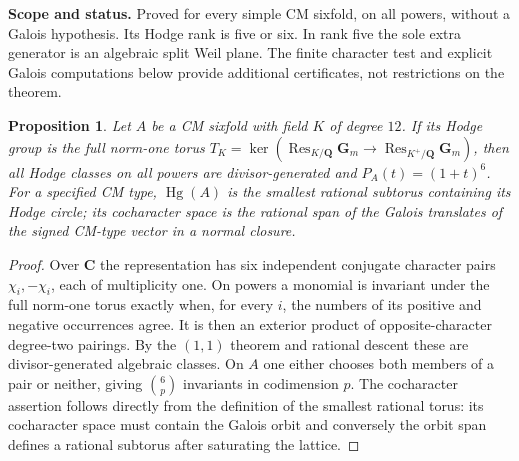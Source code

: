 \documentclass[10pt,reqno]{article}
\theoremstyle{emphasizedplain}
\newtheorem{proposition}[theorem]{Proposition}
\theoremstyle{emphasizeddefinition}
\theoremstyle{emphasizeddefinition}
\DeclareMathOperator{\Hg}{Hg}
\DeclareMathOperator{\Res}{Res}
\newcommand{\Q}{\mathbf Q}
\newcommand{\C}{\mathbf C}
\newcommand{\status}[1]{%
  \par\nobreak\smallskip\noindent
  {\setlength{\fboxsep}{7pt}%
   \colorbox{ScopeBackground}{%
    \parbox{\dimexpr\linewidth-2\fboxsep\relax}{%
     \small\textbf{\textcolor{HeadingInk}{Scope and status.}} #1}}}%
  \par\nobreak\medskip}
\renewcommand{\small}{\fontsize{8.4}{10}\selectfont}
\begin{document}
\status{Proved for every simple CM sixfold, on all powers, without
a Galois hypothesis. Its Hodge rank is five or six. In rank five the
sole extra generator is an algebraic split Weil plane. The finite
character test and explicit Galois computations below provide additional
certificates, not restrictions on the theorem.}
\begin{proposition}\label{t:CM}
Let $A$ be a CM sixfold with field $K$ of degree $12$. If its Hodge group
is the full norm-one torus
$T_K=\ker(\Res_{K/\Q}\mathbf G_m\to\Res_{K^+/\Q}\mathbf G_m)$,
then all Hodge classes on all powers are divisor-generated and
$P_A(t)=(1+t)^6$.
For a specified CM type, $\Hg(A)$ is the smallest rational subtorus
containing its Hodge circle; its cocharacter space is the rational span of
the Galois translates of the signed CM-type vector in a normal closure.
\end{proposition}
\begin{proof}
Over $\C$ the representation has six independent conjugate character
pairs $\chi_i,-\chi_i$, each of multiplicity one. On powers a monomial
is invariant under the full norm-one torus exactly when, for every $i$,
the numbers of its positive and negative occurrences agree. It is then
an exterior product of opposite-character degree-two pairings.
By the $(1,1)$ theorem and rational descent these are divisor-generated
algebraic classes. On $A$ one either chooses both members of a pair or
neither, giving $\binom6p$ invariants in codimension $p$.
The cocharacter assertion follows directly from the definition of the
smallest rational torus: its cocharacter space must contain the Galois
orbit and conversely the orbit span defines a rational subtorus after
saturating the lattice.
\end{proof}
\end{document}
